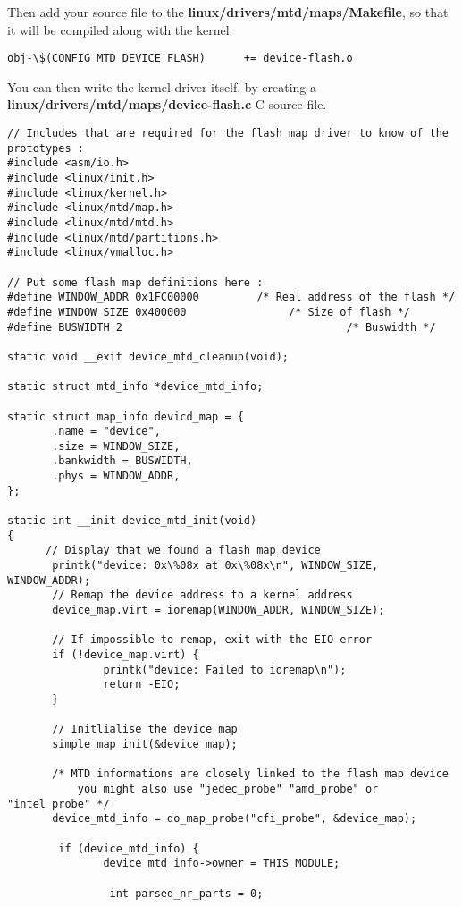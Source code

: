 Then add your source file to the \textbf{linux/drivers/mtd/maps/Makefile}, so that it will be compiled along with the kernel.

\begin{verbatim}
obj-\$(CONFIG_MTD_DEVICE_FLASH)      += device-flash.o
\end{verbatim}

You can then write the kernel driver itself, by creating a \textbf{linux/drivers/mtd/maps/device-flash.c} C source file.

\begin{verbatim}
// Includes that are required for the flash map driver to know of the prototypes :
#include <asm/io.h>
#include <linux/init.h>
#include <linux/kernel.h>
#include <linux/mtd/map.h>
#include <linux/mtd/mtd.h>
#include <linux/mtd/partitions.h>
#include <linux/vmalloc.h>

// Put some flash map definitions here :
#define WINDOW_ADDR 0x1FC00000         /* Real address of the flash */
#define WINDOW_SIZE 0x400000                /* Size of flash */
#define BUSWIDTH 2                                   /* Buswidth */

static void __exit device_mtd_cleanup(void);

static struct mtd_info *device_mtd_info;

static struct map_info devicd_map = {
       .name = "device",
       .size = WINDOW_SIZE,
       .bankwidth = BUSWIDTH,
       .phys = WINDOW_ADDR,
};

static int __init device_mtd_init(void)
{
	  // Display that we found a flash map device 
       printk("device: 0x\%08x at 0x\%08x\n", WINDOW_SIZE, WINDOW_ADDR);
	   // Remap the device address to a kernel address
       device_map.virt = ioremap(WINDOW_ADDR, WINDOW_SIZE);

       // If impossible to remap, exit with the EIO error
       if (!device_map.virt) {
               printk("device: Failed to ioremap\n");
               return -EIO;
       }

	   // Initlialise the device map
       simple_map_init(&device_map);

	   /* MTD informations are closely linked to the flash map device
	       you might also use "jedec_probe" "amd_probe" or "intel_probe" */
       device_mtd_info = do_map_probe("cfi_probe", &device_map);

 		if (device_mtd_info) {
               device_mtd_info->owner = THIS_MODULE;

				int parsed_nr_parts = 0;


\end{verbatim}
